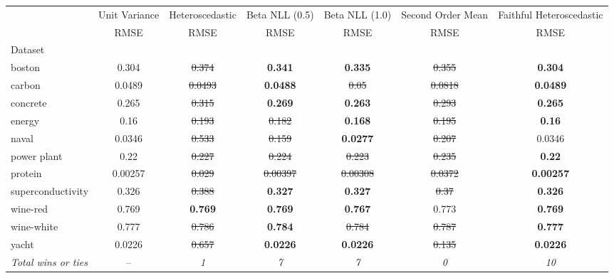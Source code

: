\begin{tabular}{l|c|c|c|c|c|c}
\toprule
{} & {Unit Variance} & {Heteroscedastic} & {Beta NLL (0.5)} & {Beta NLL (1.0)} & {Second Order Mean} & {Faithful Heteroscedastic} \\
{} & {RMSE} & {RMSE} & {RMSE} & {RMSE} & {RMSE} & {RMSE} \\
{Dataset} & {} & {} & {} & {} & {} & {} \\
\midrule
boston & 0.304 & \sout{0.374} & \textbf{0.341} & \textbf{0.335} & \sout{0.355} & \textbf{0.304} \\
carbon & 0.0489 & \sout{0.0493} & \textbf{0.0488} & \sout{0.05} & \sout{0.0818} & \textbf{0.0489} \\
concrete & 0.265 & \sout{0.315} & \textbf{0.269} & \textbf{0.263} & \sout{0.293} & \textbf{0.265} \\
energy & 0.16 & \sout{0.193} & \sout{0.182} & \textbf{0.168} & \sout{0.195} & \textbf{0.16} \\
naval & 0.0346 & \sout{0.533} & \sout{0.159} & \textbf{0.0277} & \sout{0.207} & 0.0346 \\
power plant & 0.22 & \sout{0.227} & \sout{0.224} & \sout{0.223} & \sout{0.235} & \textbf{0.22} \\
protein & 0.00257 & \sout{0.029} & \sout{0.00397} & \sout{0.00308} & \sout{0.0372} & \textbf{0.00257} \\
superconductivity & 0.326 & \sout{0.388} & \textbf{0.327} & \textbf{0.327} & \sout{0.37} & \textbf{0.326} \\
wine-red & 0.769 & \textbf{0.769} & \textbf{0.769} & \textbf{0.767} & 0.773 & \textbf{0.769} \\
wine-white & 0.777 & \sout{0.786} & \textbf{0.784} & \sout{0.784} & \sout{0.787} & \textbf{0.777} \\
yacht & 0.0226 & \sout{0.657} & \textbf{0.0226} & \textbf{0.0226} & \sout{0.135} & \textbf{0.0226} \\
\textit{{Total wins or ties}} & -- & \textit{1} & \textit{7} & \textit{7} & \textit{0} & \textit{10} \\
\bottomrule
\end{tabular}
